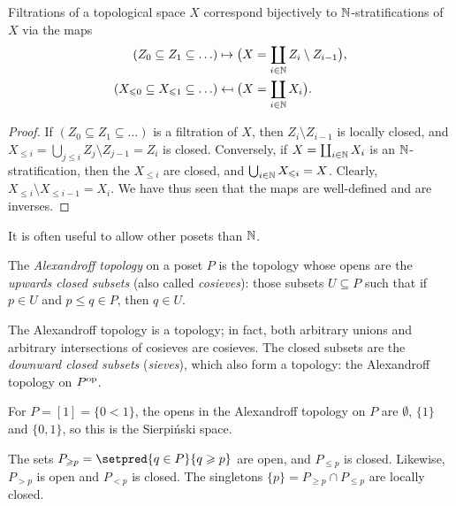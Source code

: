 \begin{lem}
Filtrations of a topological space \(X\) correspond bijectively to \(\mathbb{N}\)-stratifications of \(X\) via the maps
\begin{align*}
  (Z_0\subseteq Z_1\subseteq\ldots) & \mapsto \bigl(X=\coprod_{i\in\mathbb{N}}Z_i\setminus Z_{i-1}\bigr)\text{,} \\
  (X_{\leqslant 0}\subseteq X_{\leqslant 1}\subseteq\ldots) & \mapsfrom \bigl(X=\coprod_{i\in\mathbb{N}}X_i\bigr)\text{.}
\end{align*}
\end{lem}
\begin{proof}
If \((Z_0\subseteq Z_1\subseteq\ldots)\) is a filtration of \(X\), then \(Z_i\setminus Z_{i-1}\) is locally closed, and \(X_{\leq i}=\bigcup_{j\leq i}Z_j\setminus Z_{j-1}=Z_i\) is closed.
Conversely, if \(X=\coprod_{i\in\mathbb{N}}X_i\) is an \(\mathbb{N}\)-stratification, then the \(X_{\leq i}\) are closed, and \(\bigcup_{i\in\mathbb{N}}X_{\leqslant i}=X\).
Clearly, \(X_{\leq i}\setminus X_{\leq i-1}=X_i\).
We have thus seen that the maps are well-defined and are inverses.
\end{proof}

It is often useful to allow other posets than \(\mathbb{N}\).

\begin{defn}
The \emph{Alexandroff topology} on a poset \(P\) is the topology whose opens are the \emph{upwards closed subsets} (also called \emph{cosieves}): those subsets \(U\subseteq P\) such that if \(p\in U\) and \(p\leq q\in P\), then \(q\in U\).
\end{defn}

\begin{rmk}
The Alexandroff topology is a topology; in fact, both arbitrary unions and arbitrary intersections of cosieves are cosieves.
The closed subsets are the \emph{downward closed subsets} (\emph{sieves}), which also form a topology: the Alexandroff topology on \(P^{\mathrm{op}}\).
\end{rmk}

\begin{exmp}
For \(P=[1]=\{0<1\}\), the opens in the Alexandroff topology on \(P\) are \(\emptyset\), \(\{1\}\) and \(\{0,1\}\), so this is the Sierpiński space.
\end{exmp}

\begin{exmp}
The sets \(P_{\geq p}=\setpred{q\in P}{q\geq p}\) are open, and \(P_{\leq p}\) is closed.
Likewise, \(P_{>p}\) is open and \(P_{<p}\) is closed.
The singletons \(\{p\}=P_{\geq p}\cap P_{\leq p}\) are locally closed.
\end{exmp}

